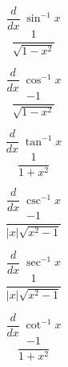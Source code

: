 \documentclass[avery5371,grid]{flashcards}
\begin{document}
\begin{flashcard}{\large \vspace*{\fill} \[ \dfrac{d}{dx}\; \sin^{-1} x  \] \vspace*{\fill}   }{\large \vspace*{\fill} \[ \dfrac{1}{\sqrt{1-x^2}}   \] \vspace*{\fill}   }\end{flashcard}

\begin{flashcard}{\large \vspace*{\fill} \[ \dfrac{d}{dx}\; \cos^{-1} x  \] \vspace*{\fill}   }{\large \vspace*{\fill} \[ \dfrac{-1}{\sqrt{1-x^2}}   \] \vspace*{\fill}   }\end{flashcard}

\begin{flashcard}{\large \vspace*{\fill} \[ \dfrac{d}{dx}\; \tan^{-1} x  \] \vspace*{\fill}   }{\large \vspace*{\fill} \[  \dfrac{1}{1+x^2}   \] \vspace*{\fill}   }\end{flashcard}

\begin{flashcard}{\large \vspace*{\fill} \[ \dfrac{d}{dx}\; \csc^{-1} x  \] \vspace*{\fill}   }{\large \vspace*{\fill} \[ \dfrac{-1}{|x| \sqrt{x^2-1}}   \] \vspace*{\fill}   }\end{flashcard}

\begin{flashcard}{\large \vspace*{\fill} \[ \dfrac{d}{dx}\; \sec^{-1} x  \] \vspace*{\fill}   }{\large \vspace*{\fill} \[ \dfrac{1}{|x| \sqrt{x^2-1}}   \] \vspace*{\fill}   }\end{flashcard}

\begin{flashcard}{\large \vspace*{\fill} \[ \dfrac{d}{dx}\; \cot^{-1} x  \] \vspace*{\fill}   }{\large \vspace*{\fill} \[ \dfrac{-1}{1+x^2}   \] \vspace*{\fill}   }\end{flashcard}
\end{document}
